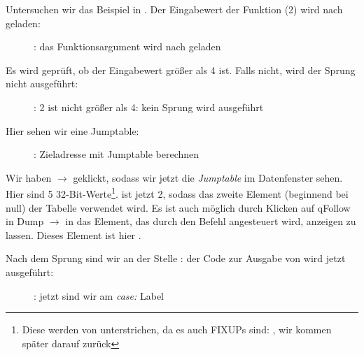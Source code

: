 \clearpage
\mysubparagraph{\olly}
\myindex{\olly}

Untersuchen wir das Beispiel in \olly.
Der Eingabewert der Funktion (2) wird nach \EAX geladen: 

\begin{figure}[H]
\centering
{}
\caption{\olly: das Funktionsargument wird nach \EAX geladen}
\label{fig:switch_lot_olly1}
\end{figure}

\clearpage
Es wird geprüft, ob der Eingabewert größer als 4 ist.
Falls nicht, wird der  Sprung nicht ausgeführt:
\begin{figure}[H]
\centering
{}
\caption{\olly: 2 ist nicht größer als 4: kein Sprung wird ausgeführt}
\label{fig:switch_lot_olly2}
\end{figure}

\clearpage
Hier sehen wir eine Jumptable:

\begin{figure}[H]
\centering
{}
\caption{\olly: Zieladresse mit Jumptable berechnen}
\label{fig:switch_lot_olly3}
\end{figure}
Wir haben $\rightarrow$  geklickt, sodass wir jetzt die \emph{Jumptable} im
Datenfenster sehen. Hier sind 5 32-Bit-Werte\footnote{Diese werden von \olly unterstrichen, da
es auch FIXUPs sind: , wir kommen später darauf zurück}.
\ECX ist jetzt 2, sodass das zweite Element (beginnend bei null) der Tabelle verwendet wird.
Es ist auch möglich durch Klicken auf q{Follow in Dump} $\rightarrow$ 
 in \olly das Element, das durch den \JMP Befehl angesteuert wird, anzeigen zu lassen. Dieses Element
ist hier .

\clearpage
Nach dem Sprung sind wir an der Stelle : der Code zur Ausgabe von  wird jetzt ausgeführt:

\begin{figure}[H]
\centering
{}
\caption{\olly: jetzt sind wir am \emph{case:} Label}
\label{fig:switch_lot_olly4}
\end{figure}

